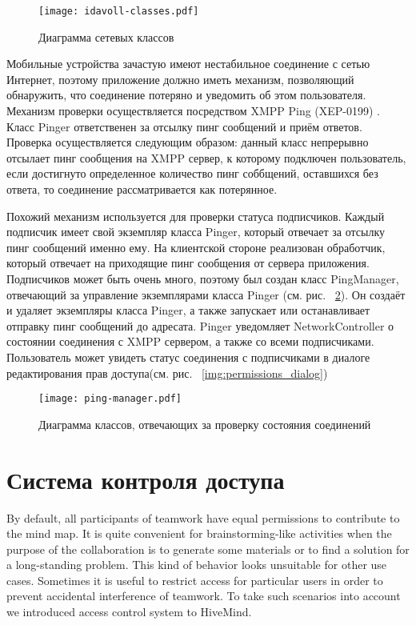 \begin{figure}
  \centering
  \texttt{[image: idavoll-classes.pdf]}
  \caption{Диаграмма сетевых классов}
  \label{img:network_classes}
\end{figure}

Мобильные устройства зачастую имеют нестабильное соединение с сетью Интернет,
поэтому приложение должно иметь механизм, позволяющий обнаружить, что соединение
потеряно и уведомить об этом пользователя. Механизм проверки осуществляется
посредством XMPP Ping (XEP-0199) \cite{xep-0199}. Класс Pinger
ответственен за отсылку пинг сообщений и приём ответов. Проверка осуществляется
следующим образом: данный класс непрерывно отсылает пинг сообщения на XMPP
сервер, к которому подключен пользователь, если достигнуто определенное
количество пинг соббщений, оставшихся без ответа, то соединение рассматривается
как потерянное.

Похожий механизм используется для проверки статуса подписчиков. Каждый
подписчик имеет свой экземпляр класса Pinger, который отвечает за отсылку пинг
сообщений именно ему. На клиентской стороне реализован обработчик, который
отвечает на приходящие пинг сообщения от сервера приложения. Подписчиков может
быть очень много, поэтому был создан класс PingManager, отвечающий за управление
экземплярами класса Pinger (см. рис. ~\ref{img:ping_manager}). Он
создаёт и удаляет экземпляры класса Pinger, а также запускает или останавливает
отправку пинг сообщений до адресата. Pinger уведомляет NetworkController о
состоянии соединения с XMPP сервером, а также со всеми подписчиками.
Пользователь может увидеть статус соединения с подписчиками в диалоге
редактирования прав доступа(см. рис. ~\ref{img:permissions_dialog})

\begin{figure}
  \centering
  \texttt{[image: ping-manager.pdf]}
  \caption{Диаграмма классов, отвечающих за проверку состояния соединений}
  \label{img:ping_manager}
\end{figure}


\section{Система контроля доступа}

By default, all participants of teamwork have equal permissions to contribute to
the mind map. It is quite convenient for brainstorming-like activities when the
purpose of the collaboration is to generate some materials or to find a solution
for a long-standing problem. This kind of behavior looks unsuitable for other
use cases. Sometimes it is useful to restrict access for particular users in
order to prevent accidental interference of teamwork. To take such scenarios
into account we introduced access control system to HiveMind.

